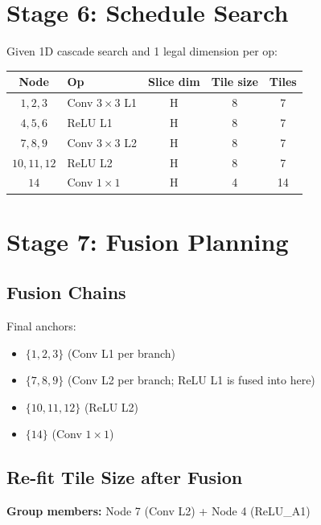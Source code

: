 \documentclass[11pt,a4paper]{article}
\begin{document}
\section{Stage 6: Schedule Search}

Given 1D cascade search and 1 legal dimension per op:

\begin{table}[H]
\centering
\begin{tabular}{clccc}
\toprule
\textbf{Node} & \textbf{Op} & \textbf{Slice dim} & \textbf{Tile size} & \textbf{Tiles} \\
\midrule
$1, 2, 3$   & Conv $3\times 3$ L1 & H & 8 & 7 \\
$4, 5, 6$   & ReLU L1             & H & 8 & 7 \\
$7, 8, 9$   & Conv $3\times 3$ L2 & H & 8 & 7 \\
$10, 11, 12$ & ReLU L2             & H & 8 & 7 \\
$14$         & Conv $1\times 1$    & H & 4 & 14 \\
\bottomrule
\end{tabular}
\end{table}

\section{Stage 7: Fusion Planning}

\subsection{Fusion Chains}
Final anchors:
\begin{itemize}
    \item $\{1, 2, 3\}$ (Conv L1 per branch)
    \item $\{7, 8, 9\}$ (Conv L2 per branch; ReLU L1 is fused into here)
    \item $\{10, 11, 12\}$ (ReLU L2)
    \item $\{14\}$ (Conv $1\times 1$)
\end{itemize}

\subsection{Re-fit Tile Size after Fusion}
\textbf{Group members:}
Node 7 (Conv L2) + Node 4 (ReLU\_A1)
\end{document}
